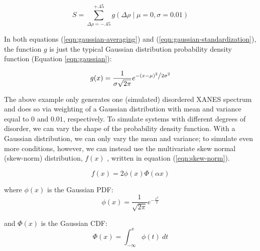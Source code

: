 \begin{equation}
	\label{eqn:gaussian-standardization}
	S = \sum_{\Delta\rho=-.45}^{+.45} g\left(\Delta \rho \mid \mu=0, \sigma=0.01\right)
\end{equation}

\noindent
In both equations (\ref{eqn:gaussian-averaging}) and (\ref{eqn:gaussian-standardization}), the function $ g $ is just the typical Gaussian distribution probability density function (Equation \ref{eqn:gaussian}): 

\begin{equation}
	\label{eqn:gaussian}
	g(x) = \frac{1}{{\sigma \sqrt {2\pi } }}e^{{{ - \left( {x - \mu } \right)^2 } \mathord{\left/ {\vphantom {{ - \left( {x - \mu } \right)^2 } {2\sigma ^2 }}} \right. \kern-\nulldelimiterspace} {2\sigma ^2 }}}
\end{equation}

The above example only generates one (simulated) disordered XANES spectrum and does so via weighting of a Gaussian distribution with mean and variance equal to $ 0 $ and $ 0.01 $, respectively. To simulate systems with different degrees of disorder, we can vary the shape of the probability density function. With a Gaussian distribution, we can only vary the mean and variance; to simulate even more conditions, however, we can instead use the multivariate skew normal (skew-norm) distribution, $ f(x) $ \cite{skewnorm_Azzalini_1999} \cite{2020SciPy-NMeth}, written in equation (\ref{eqn:skew-norm}). 

\begin{equation}
	\label{eqn:skew-norm}
	f(x)=2\phi (x)\Phi (\alpha x)
\end{equation}
 
\noindent
where $ \phi(x) $ is the Gaussian PDF:
\begin{equation}
	\label{eqn:skew-norm-pdf}
	\phi (x)={\frac  {1}{{\sqrt  {2\pi }}}}e^{{-{\frac  {x^{2}}{2}}}}
\end{equation}

\noindent
and $ \Phi (x) $ is the Gaussian CDF:
\begin{equation}
	\label{eqn:skew-norm-cdf}
	\Phi (x)=\int _{{-\infty }}^{{x}}\phi (t)\ dt
\end{equation}


